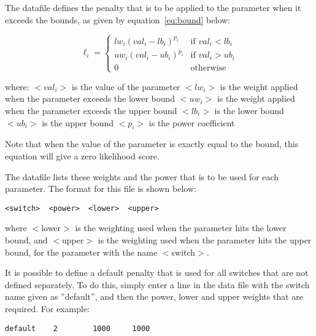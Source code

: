 \documentclass[10pt,twoside]{book}
\begin{document}
The datafile defines the penalty that is to be applied to the parameter when it exceeds the bounds, as given by equation~\ref{eq:bound} below:

\begin{equation}\label{eq:bound}
\ell_{i} =
\begin{cases}
lw_{i} (val_{i} - lb_{i})^{p_{i}} & \textrm{if $val_{i} < lb_i$} \\
uw_{i} (val_{i} - ub_{i})^{p_{i}} & \textrm{if $val_{i} > ub_i$} \\
0 & \textrm{otherwise}
\end{cases}
\end{equation}

where:\newline
$<val_i>$ is the value of the parameter\newline
$<lw_i>$ is the weight applied when the parameter exceeds the lower bound\newline
$<uw_i>$ is the weight applied when the parameter exceeds the upper bound\newline
$<lb_i>$ is the lower bound\newline
$<ub_i>$ is the upper bound\newline
$<p_i>$ is the power coefficient\newline

Note that when the value of the parameter is exactly equal to the bound, this equation will give a zero likelihood score.

\bigskip
The datafile lists these weights and the power that is to be used for each parameter.  The format for this file is shown below:

{\small\begin{verbatim}
<switch>  <power>  <lower>  <upper>
\end{verbatim}}

where $<$lower$>$ is the weighting used when the parameter hits the lower bound, and $<$upper$>$ is the weighting used when the parameter hits the upper bound, for the parameter with the name $<$switch$>$.

\bigskip
It is possible to define a default penalty that is used for all switches that are not defined separately.  To do this, simply enter a line in the data file with the switch name given as ''default'', and then the power, lower and upper weights that are required.  For example:

{\small\begin{verbatim}
default    2        1000     1000
\end{verbatim}}
\end{document}
